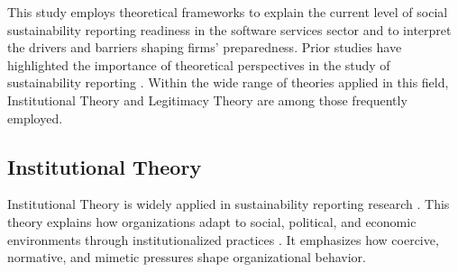 This study employs theoretical frameworks to explain the current level 
of social sustainability reporting readiness in the software services sector 
and to interpret the drivers and barriers shaping firms' preparedness.
Prior studies have highlighted the importance of theoretical perspectives 
in the study of sustainability reporting \parencite{Gesso2023, Rezaee2016, Lozano2015}.
Within the wide range of theories applied in this field, Institutional Theory
and Legitimacy Theory are among those frequently employed.

\subsection{Institutional Theory}
Institutional Theory is widely applied in sustainability 
reporting research \parencite{Campbell2007}. This theory explains 
how organizations adapt to social, political, and economic environments 
through institutionalized practices 
\parencite{Meyer1977, DiMaggio1983}.
It emphasizes how coercive, normative, and mimetic pressures shape organizational behavior.


